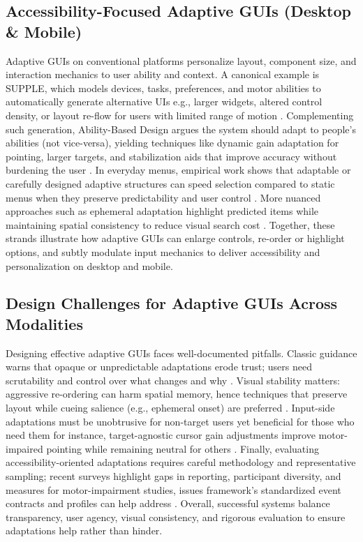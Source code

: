 \documentclass[openany]{book}
\begin{document}
\subsection{Accessibility-Focused Adaptive GUIs (Desktop \& Mobile)}
Adaptive GUIs on conventional platforms personalize layout, component size, and interaction mechanics to user ability and context. A canonical example is SUPPLE, which models devices, tasks, preferences, and motor abilities to automatically generate alternative UIs e.g., larger widgets, altered control density, or layout re-flow for users with limited range of motion \cite{Gajos2010Supple}. Complementing such generation, Ability-Based Design argues the system should adapt to people’s abilities (not vice-versa), yielding techniques like dynamic gain adaptation for pointing, larger targets, and stabilization aids that improve accuracy without burdening the user \cite{Wobbrock2011ABD}. In everyday menus, empirical work shows that adaptable or carefully designed adaptive structures can speed selection compared to static menus when they preserve predictability and user control \cite{Findlater2004Menus,Sears1994SplitMenus}. More nuanced approaches such as ephemeral adaptation highlight predicted items while maintaining spatial consistency to reduce visual search cost \cite{Findlater2009Ephemeral}. Together, these strands illustrate how adaptive GUIs can enlarge controls, re-order or highlight options, and subtly modulate input mechanics to deliver accessibility and personalization on desktop and mobile.
     
\subsection{Design Challenges for Adaptive GUIs Across Modalities}
Designing effective adaptive GUIs faces well-documented pitfalls. Classic guidance warns that opaque or unpredictable adaptations erode trust; users need scrutability and control over what changes and why \cite{Jameson2003Adaptive,Findlater2004Menus}. Visual stability matters: aggressive re-ordering can harm spatial memory, hence techniques that preserve layout while cueing salience (e.g., ephemeral onset) are preferred \cite{Findlater2009Ephemeral}. Input-side adaptations must be unobtrusive for non-target users yet beneficial for those who need them for instance, target-agnostic cursor gain adjustments improve motor-impaired pointing while remaining neutral for others \cite{Wobbrock2009AngleMouse}. Finally, evaluating accessibility-oriented adaptations requires careful methodology and representative sampling; recent surveys highlight gaps in reporting, participant diversity, and measures for motor-impairment studies, issues framework’s standardized event contracts and profiles can help address \cite{Sarsenbayeva2022Motor}. Overall, successful systems balance transparency, user agency, visual consistency, and rigorous evaluation to ensure adaptations help rather than hinder.
\end{document}
